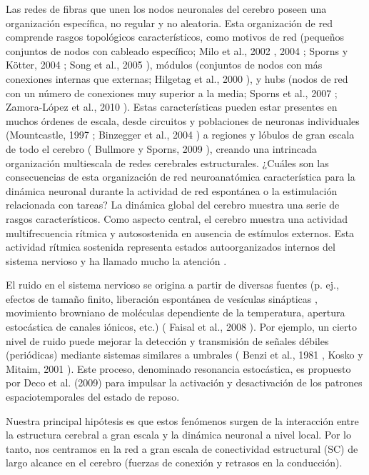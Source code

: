 Las redes de fibras que unen los nodos neuronales del cerebro poseen una organización específica, no regular y no aleatoria. Esta organización de red comprende rasgos topológicos característicos, como motivos de red (pequeños conjuntos de nodos con cableado específico; Milo et al., 2002 , 2004 ; Sporns y Kötter, 2004 ; Song et al., 2005 ), módulos (conjuntos de nodos con más conexiones internas que externas; Hilgetag et al., 2000 ), y hubs (nodos de red con un número de conexiones muy superior a la media; Sporns et al., 2007 ; Zamora-López et al., 2010 ). Estas características pueden estar presentes en muchos órdenes de escala, desde circuitos y poblaciones de neuronas individuales (Mountcastle, 1997 ; Binzegger et al., 2004 ) a regiones y lóbulos de gran escala de todo el cerebro ( Bullmore y Sporns, 2009 ), creando una intrincada organización multiescala de redes cerebrales estructurales. ¿Cuáles son las consecuencias de esta organización de red neuroanatómica característica para la dinámica neuronal durante la actividad de red espontánea o la estimulación relacionada con tareas? La dinámica global del cerebro muestra una serie de rasgos característicos. Como aspecto central, el cerebro muestra una actividad multifrecuencia rítmica y autosostenida en ausencia de estímulos externos. Esta actividad rítmica sostenida representa estados autoorganizados internos del sistema nervioso y ha llamado mucho la atención \cite{garcia_building_2012}.


El ruido en el sistema nervioso se origina a partir de diversas fuentes (p. ej., efectos de tamaño finito, liberación espontánea de vesículas sinápticas , movimiento browniano de moléculas dependiente de la temperatura, apertura estocástica de canales iónicos, etc.) ( Faisal et al., 2008 ). 
Por ejemplo, un cierto nivel de ruido puede mejorar la detección y transmisión de señales débiles (periódicas) mediante sistemas similares a umbrales ( Benzi et al., 1981 , Kosko y Mitaim, 2001 ). Este proceso, denominado resonancia estocástica, es propuesto por Deco et al. (2009) para impulsar la activación y desactivación de los patrones espaciotemporales del estado de reposo.




 
 
 Nuestra principal hipótesis es que estos fenómenos surgen de la interacción entre la estructura cerebral a gran escala y la dinámica neuronal a nivel local. Por lo tanto, nos centramos en la red a gran escala de conectividad estructural (SC) de largo alcance en el cerebro (fuerzas de conexión y retrasos en la conducción). 





